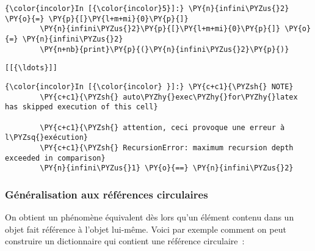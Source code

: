    \begin{Verbatim}[commandchars=\\\{\}]
{\color{incolor}In [{\color{incolor}5}]:} \PY{n}{infini\PYZus{}2} \PY{o}{=} \PY{p}{[}\PY{l+m+mi}{0}\PY{p}{]}
        \PY{n}{infini\PYZus{}2}\PY{p}{[}\PY{l+m+mi}{0}\PY{p}{]} \PY{o}{=} \PY{n}{infini\PYZus{}2}
        \PY{n+nb}{print}\PY{p}{(}\PY{n}{infini\PYZus{}2}\PY{p}{)}
\end{Verbatim}


    \begin{Verbatim}[commandchars=\\\{\}]
[[{\ldots}]]

    \end{Verbatim}

    \begin{Verbatim}[commandchars=\\\{\}]
{\color{incolor}In [{\color{incolor} }]:} \PY{c+c1}{\PYZsh{} NOTE}
        \PY{c+c1}{\PYZsh{} auto\PYZhy{}exec\PYZhy{}for\PYZhy{}latex has skipped execution of this cell}
        
        \PY{c+c1}{\PYZsh{} attention, ceci provoque une erreur à l\PYZsq{}exécution}
        \PY{c+c1}{\PYZsh{} RecursionError: maximum recursion depth exceeded in comparison}
        \PY{n}{infini\PYZus{}1} \PY{o}{==} \PY{n}{infini\PYZus{}2}
\end{Verbatim}


    \hypertarget{guxe9nuxe9ralisation-aux-ruxe9fuxe9rences-circulaires}{%
\subsubsection{Généralisation aux références
circulaires}\label{guxe9nuxe9ralisation-aux-ruxe9fuxe9rences-circulaires}}

    On obtient un phénomène équivalent dès lors qu'un élément contenu dans
un objet fait référence à l'objet lui-même. Voici par exemple comment on
peut construire un dictionnaire qui contient une référence circulaire~:

